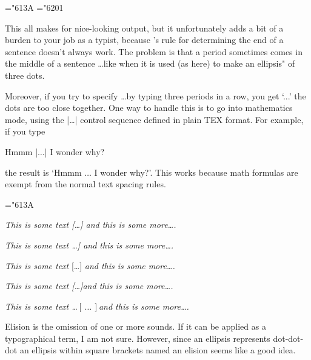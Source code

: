 \begin{teX}
\mathchardef\ldotp="613A 
\mathchardef\cdotp="6201 

\def\ldots{\mathinner{\ldotp\ldotp\ldotp}}
\def\cdots{\mathinner{\cdotp\cdotp\cdotp}}
\def\vdots{\vbox{\baselineskip4\p@ \lineskiplimit\z@
    \kern6\p@\hbox{.}\hbox{.}\hbox{.}}}
\def\ddots{\mathinner{\mkern1mu\raise7\p@\vbox{\kern7\p@\hbox{.}}\mkern2mu
    \raise4\p@\hbox{.}\mkern2mu\raise\p@\hbox{.}\mkern1mu}}
\def\dots{\relax\ifmmode\ldots\else$\m@th\ldots\,$\fi}
\end{teX}


This all makes for nice-looking output, but it unfortunately adds a bit
of a burden to your job as a typist, because \tex's rule for determining the end of
a sentence doesn't always work. The problem is that a period sometimes comes
in the middle of a sentence \dots like when it is used (as here) to make an ellipsis" of three dots.

Moreover, if you try to specify \ldots by typing three periods in a row,
you get `...' the dots are too close together. One way to handle this is to go
into mathematics mode, using the |\ldots| control sequence defined in plain TEX
format. For example, if you type

Hmmm |$\ldots$| I wonder why?

the result is `Hmmm $\ldots$ I wonder why?'. This works because math formulas are
exempt from the normal text spacing rules.


\begin{teXXX}
\mathchardef\ldotp="613A %
\def\ldots{\mathinner{\ldotp\ldotp\ldotp}}
\end{teXXX}

\def\elide{\textup{[\phantom{,}\dots]\xspace}}


\emph{This is some text {[\thinspace\ldots\thinspace]} and this is some more\dots .}

\emph{This is some text {\smaller{[}\ldots]} and this is some more\dots .}

\emph{This is some text} {[\ldots]} \emph{and this is some more\dots .}

\emph{This is some text \elide and this is some more\dots .}


\def\elide{\relax\ifmmode\ldots\else $[\,\ldots\,]$\fi}

\emph{This is some text \elide and this is some more\dots .}

Elision is the omission of one or more sounds. If it can be applied as a typographical term, I am not sure. However, since an ellipsis represents dot-dot-dot an ellipsis within square brackets named an elision seems like a good idea.

